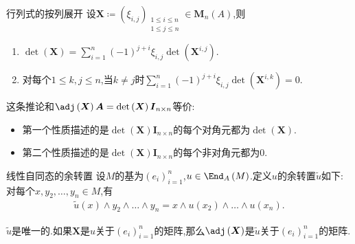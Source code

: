 \begin{corollary}{行列式的按列展开}{}
	设$\boldsymbol{X}\coloneq\left(\xi_{i,j}\right)_{\substack{1\leq i\leq n\\1\leq j\leq n}}\in\mathbf{M}_{n}\left(A\right)$,则
	\begin{enumerate}
		\item $\det\left(\boldsymbol{X}\right)=\sum\limits_{i=1}^{n}\left(-1\right)^{j+i}\xi_{i,j}\det\left(\boldsymbol{X}^{i,j}\right)$.
		\item 对每个$1\leq k,j\leq n$,当$k\neq j$时$\sum\limits_{i=1}^{n}\left(-1\right)^{j+i}\xi_{i,j}\det\left(\boldsymbol{X}^{i,k}\right)=0$.
	\end{enumerate}
\end{corollary}

\begin{remark}{}{}
	这条推论和$\adj\left(\boldsymbol{X}\right)\boldsymbol{A}=\det\left(\boldsymbol{X}\right)\boldsymbol{I}_{n\times n}$等价:
	\begin{itemize}
		\item 第一个性质描述的是$\det\left(\boldsymbol{X}\right)\boldsymbol{I}_{n\times n}$的每个对角元都为$\det\left(\boldsymbol{X}\right)$.
		\item 第二个性质描述的是$\det\left(\boldsymbol{X}\right)\boldsymbol{I}_{n\times n}$的每个非对角元都为$0$.
	\end{itemize}
\end{remark}

\begin{definition}{线性自同态的余转置}{}
	设$M$的基为$\left(e_{i}\right)_{i=1}^{n}$,$u\in\End_{A}\left(M\right)$.定义$u$的余转置$\tilde{u}$如下:对每个$x,y_{2},\ldots,y_{n}\in M$,有
	\begin{align*}
		\tilde{u}\left(x\right)\wedge y_{2}\wedge\ldots\wedge y_{n}=x\wedge u\left(x_{2}\right)\wedge\ldots\wedge u\left(x_{n}\right).
	\end{align*}
\end{definition}

\begin{remark}{}{}
	$\tilde{u}$是唯一的.如果$\boldsymbol{X}$是$u$关于$\left(e_{i}\right)_{i=1}^{n}$的矩阵,那么$\adj\left(\boldsymbol{X}\right)$是$\tilde{u}$关于$\left(e_{i}\right)_{i=1}^{n}$的矩阵.
\end{remark}

